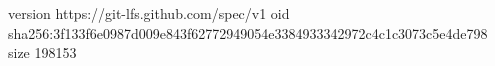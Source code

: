 version https://git-lfs.github.com/spec/v1
oid sha256:3f133f6e0987d009e843f62772949054e3384933342972c4c1c3073c5e4de798
size 198153

